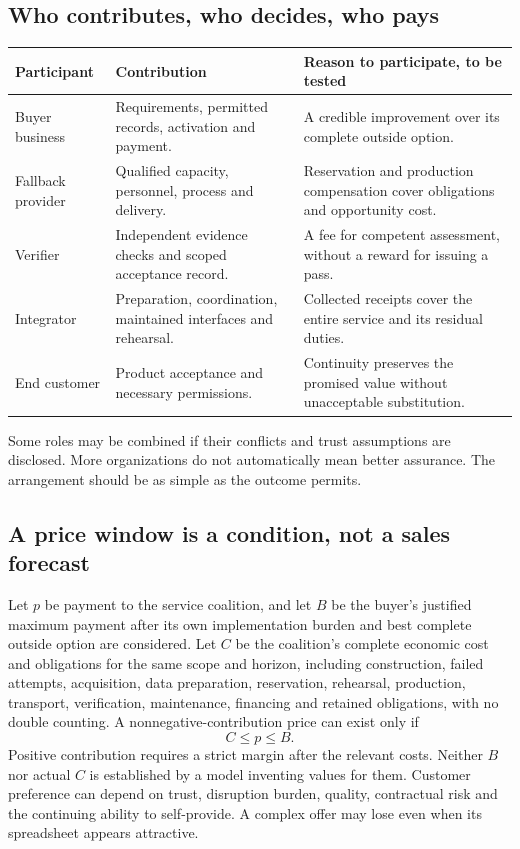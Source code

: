 \documentclass[11pt,a4paper]{article}
\begin{document}
\subsection{Who contributes, who decides, who pays}
\begin{center}\small
\begin{tabularx}{\textwidth}{P{.21\textwidth}YY}
\toprule
\textbf{Participant} & \textbf{Contribution} & \textbf{Reason to participate, to be tested}\\
\midrule
Buyer business & Requirements, permitted records, activation and payment. & A credible improvement over its complete outside option.\\
Fallback provider & Qualified capacity, personnel, process and delivery. & Reservation and production compensation cover obligations and opportunity cost.\\
Verifier & Independent evidence checks and scoped acceptance record. & A fee for competent assessment, without a reward for issuing a pass.\\
Integrator & Preparation, coordination, maintained interfaces and rehearsal. & Collected receipts cover the entire service and its residual duties.\\
End customer & Product acceptance and necessary permissions. & Continuity preserves the promised value without unacceptable substitution.\\
\bottomrule
\end{tabularx}
\end{center}
Some roles may be combined if their conflicts and trust assumptions are disclosed. More organizations do not automatically mean better assurance. The arrangement should be as simple as the outcome permits.

\subsection{A price window is a condition, not a sales forecast}
Let $p$ be payment to the service coalition, and let $B$ be the buyer's justified maximum payment after its own implementation burden and best complete outside option are considered. Let $C$ be the coalition's complete economic cost and obligations for the same scope and horizon, including construction, failed attempts, acquisition, data preparation, reservation, rehearsal, production, transport, verification, maintenance, financing and retained obligations, with no double counting. A nonnegative-contribution price can exist only if
\begin{equation}
C\leq p\leq B.
\end{equation}
Positive contribution requires a strict margin after the relevant costs. Neither $B$ nor actual $C$ is established by a model inventing values for them. Customer preference can depend on trust, disruption burden, quality, contractual risk and the continuing ability to self-provide. A complex offer may lose even when its spreadsheet appears attractive.
\end{document}
